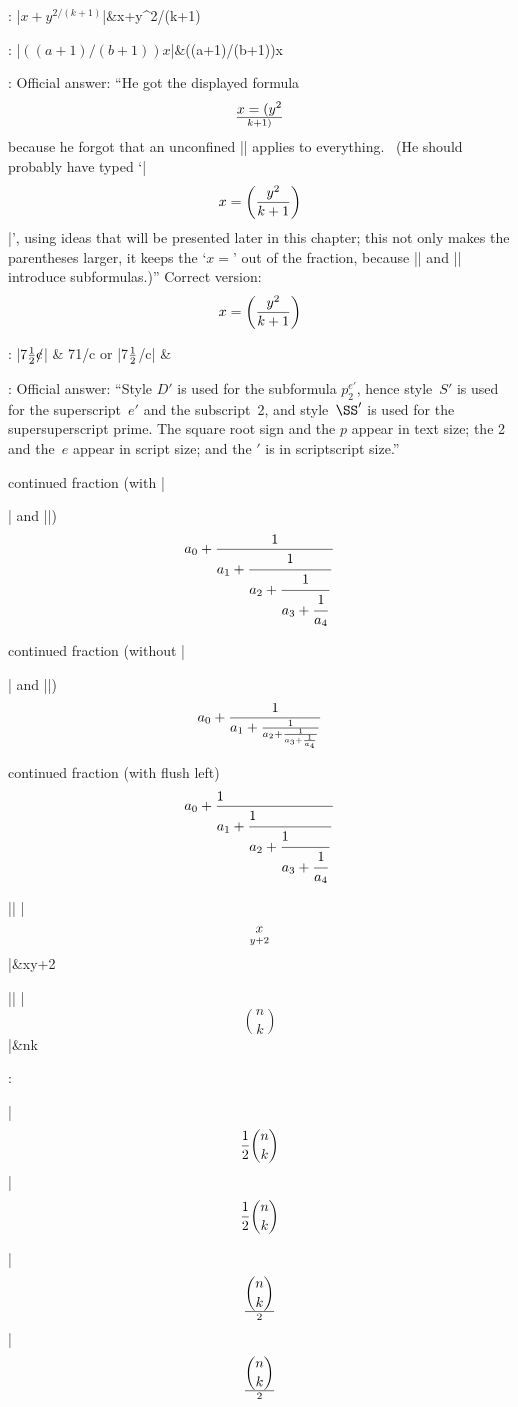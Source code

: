 :
\beginmathdemo
|$x+y^{2/(k+1)}$|&x+y^{2/(k+1)}\cr
\endmathdemo

:
\beginmathdemo
|$((a+1)/(b+1))x$|&((a+1)/(b+1))x\cr
\endmathdemo

:
Official answer: ``He got the displayed formula$$x=(y^2\over k+1)$$ because he forgot
that an unconfined |\over| applies to everything.  \ (He should probably
have typed `|$$x=\left(y^2\over k+1\right)$$|', using ideas that will be
presented later in this chapter; this not only makes the parentheses
larger, it keeps the `$x=$' out of the fraction, because |\left| and
|\right| introduce subformulas.)''\parbreak
Correct version: $$x=\left(y^2\over k+1\right)$$

:
{\def\cents{\hbox{\rm\rlap/c}}
\beginmathdemo
|$7{1\over2}\cents$| & 7{1}\cents\cr
or |7$1\over2$\cents| & \cr
\endmathdemo}

:
Official answer: ``Style $D'$ is used for the subformula $p_2^{e'}$, hence style~$S'$
is used for the superscript~$e'$ and the subscript~2, and style~$\SS'$
is used for the supersuperscript prime. The square root sign and the $p$
appear in text size; the 2 and the~$e$ appear in script size; and the
$\prime$ is in scriptscript size.''

\myhr

\item\bull continued fraction (with |\strut| and |\displaystyle|)
$$a_0+{1\over\displaystyle a_1+
          {\strut 1\over\displaystyle a_2+
            {\strut 1\over\displaystyle a_3+
              {\strut 1\over a_4}}}}$$
\item\bull continued fraction (without |\strut| and |\displaystyle|)
$$a_0+{1\over a_1+{1\over
      a_2+{1\over a_3+{1\over a_4}}}}$$
\item\bull continued fraction (with flush left)
$$a_0+{1\hfill\over\displaystyle a_1+
          {\strut1\hfill\over\displaystyle a_2+
            {\strut1\hfill\over\displaystyle a_3+
              {\strut1\over a_4}}}}$$
\item\bull |\atop|
\begindisplaymathdemo
|$$x\atop y+2$$|&x\atop y+2\cr
\endmathdemo

\item\bull |\choose|
\begindisplaymathdemo
|$$n\choose k$$|&n\choose k\cr
\endmathdemo

\myhr

:
\item\bull |$${1\over2}{n\choose k}$$| $${1\over2}{n\choose k}$$
\item\bull |$$\displaystyle{n\choose k}\over2$$| $$\displaystyle{n\choose k}\over2$$


